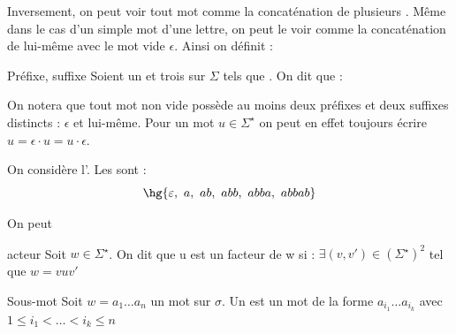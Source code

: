 \documentclass[a4paper,french,bookmarks]{book}
\begin{document}
    Inversement, on peut voir tout mot comme la concaténation de plusieurs . Même dans le cas d'un simple mot d'une lettre, on peut le voir comme la concaténation de lui-même avec le mot vide $\epsilon$. Ainsi on définit : 
    
    \begin{definition}{Préfixe, suffixe}{}
        Soient \hg{$\Sigma$} un  et trois  sur $\Sigma$ tels que . On dit que :
        \begin{enumerate}
            \begin{minipage}{0.5\linewidth}
                \itast {}
            \end{minipage}
            \begin{minipage}{0.5\linewidth}
                \itast {}
            \end{minipage}
        \end{enumerate}
    \end{definition}
    
    On notera que tout mot non vide possède au moins deux préfixes et deux suffixes distincts : $\epsilon$ et lui-même. Pour un mot $u \in \Sigma^\star$ on peut en effet toujours écrire $u = \epsilon\cdot u = u \cdot \epsilon$.
    
    \begin{example}{}{}
        On considère l'. Les  sont :
        \[ \hg{\epsilon,\ a,\ ab,\ abb,\ abba,\ abbab} \]
    \end{example}
    
    On peut 
    
    \begin{definition}{acteur}{}
        Soit $w \in \Sigma^\star$.
        On dit que u est un facteur de w si :
        $\exists (v,v') \in (\Sigma^\star)^2$ tel que $w = v u v'$
        
    \end{definition}
    
    \begin{definition}{Sous-mot}{}
        Soit $w=a_1 \dots a_n$ un mot sur $\sigma$.
        Un  est un mot de la forme $a_{i_1} \dots a_{i_k}$ avec $1 \leq i_1 < \dots < i_k \leq n$
        
    \end{definition}
    
\end{document}
